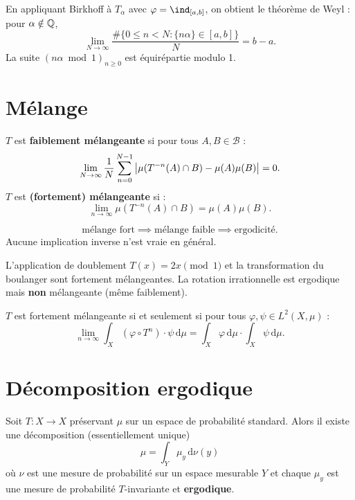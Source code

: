 \begin{exemple}
En appliquant Birkhoff \`a $T_\alpha$ avec $\varphi = \ind_{[a,b]}$, on obtient
le th\'eor\`eme de Weyl : pour $\alpha \notin \mathbb{Q}$,
\[
    \lim_{N \to \infty} \frac{\#\{0 \leq n < N : \{n\alpha\} \in [a, b]\}}{N}
    = b - a.
\]
La suite $(n\alpha \bmod 1)_{n \geq 0}$ est \'equir\'epartie modulo 1.
\end{exemple}

\section{M\'elange}

\begin{definition}
$T$ est \textbf{faiblement m\'elangeante} si pour tous $A, B \in \mathcal{B}$ :
\[
    \lim_{N \to \infty} \frac{1}{N} \sum_{n=0}^{N-1}
    \left| \mu(T^{-n}(A) \cap B) - \mu(A)\mu(B) \right| = 0.
\]
$T$ est \textbf{(fortement) m\'elangeante} si :
\[
    \lim_{n \to \infty} \mu(T^{-n}(A) \cap B) = \mu(A)\mu(B).
\]
\end{definition}

\begin{proposition}[Implications]
\[
    \text{m\'elange fort} \implies \text{m\'elange faible} \implies \text{ergodicit\'e}.
\]
Aucune implication inverse n'est vraie en g\'en\'eral.
\end{proposition}

\begin{exemple}
L'application de doublement $T(x) = 2x \pmod{1}$ et la transformation du
boulanger sont fortement m\'elangeantes. La rotation irrationnelle est
ergodique mais \textbf{non} m\'elangeante (m\^eme faiblement).
\end{exemple}

\begin{theoreme}
$T$ est fortement m\'elangeante si et seulement si pour tous
$\varphi, \psi \in L^2(X, \mu)$ :
\[
    \lim_{n \to \infty} \int_X (\varphi \circ T^n) \cdot \psi \, \mathrm{d}\mu
    = \int_X \varphi \, \mathrm{d}\mu \cdot \int_X \psi \, \mathrm{d}\mu.
\]
\end{theoreme}

\section{D\'ecomposition ergodique}

\begin{theoreme}
Soit $T : X \to X$ pr\'eservant $\mu$ sur un espace de probabilit\'e standard.
Alors il existe une d\'ecomposition (essentiellement unique)
\[
    \mu = \int_Y \mu_y \, \mathrm{d}\nu(y)
\]
o\`u $\nu$ est une mesure de probabilit\'e sur un espace mesurable $Y$ et
chaque $\mu_y$ est une mesure de probabilit\'e $T$-invariante et
\textbf{ergodique}.
\end{theoreme}

